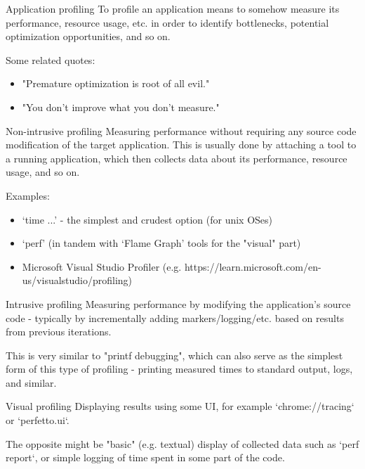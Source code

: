 \documentclass[aspectratio=169]{beamer}
\begin{document}
\begin{frame}{Application profiling}
    To profile an application means to somehow measure its performance, resource usage, etc. in order to identify bottlenecks, potential optimization opportunities, and so on.

    Some related quotes:
    \begin{itemize}
        \item "Premature optimization is root of all evil."
        \item "You don't improve what you don't measure."
    \end{itemize}

\end{frame}
\begin{frame}{Non-intrusive profiling}
    Measuring performance without requiring any source code modification of the target application. This is usually done by attaching a tool to a running application, which then collects data about its performance, resource usage, and so on.

    Examples:

    \begin{itemize}
        \item `time ...' - the simplest and crudest option (for unix OSes)
        \item `perf' (in tandem with `Flame Graph' tools for the "visual" part)
        \item Microsoft Visual Studio Profiler (e.g. https://learn.microsoft.com/en-us/visualstudio/profiling)
    \end{itemize}

\end{frame}

\begin{frame}{Intrusive profiling}
    Measuring performance by modifying the application's source code - typically by incrementally adding markers/logging/etc. based on results from previous iterations.

    This is very similar to "printf debugging", which can also serve as the simplest form of this type of profiling - printing measured times to standard output, logs, and similar.

\end{frame}

\begin{frame}{Visual profiling}
    Displaying results using some UI, for example `chrome://tracing` or `perfetto.ui`.

    The opposite might be "basic" (e.g. textual) display of collected data such as `perf report`, or simple logging of time spent in some part of the code.

\end{frame}
\end{document}
